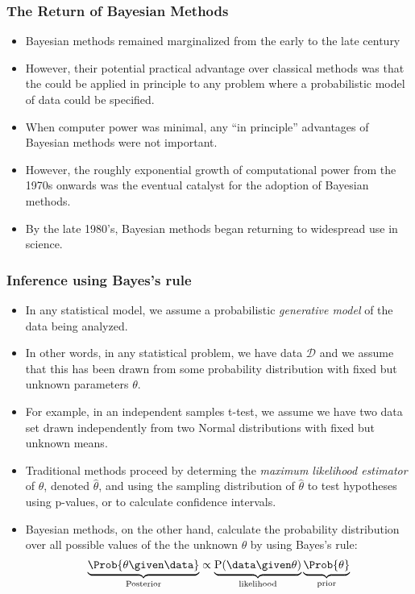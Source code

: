 \documentclass{slides}
\begin{document}
\begin{frame}
	\frametitle{The Return of Bayesian Methods}
	
	\begin{itemize}

		\item Bayesian methods remained marginalized from the early to
			the late  century

		\item However, their potential practical advantage over
			classical methods was that the could be applied in
			principle to any problem where a probabilistic model of
			data could be specified.  

		\item When computer power was minimal, any ``in principle''
			advantages of Bayesian methods were not important.

		\item However, the roughly exponential growth of computational
			power from the 1970s onwards was the eventual catalyst
			for the adoption of Bayesian methods.

		\item By the late 1980's, Bayesian methods began returning to
			widespread use in science.

	\end{itemize}
\end{frame}

\begin{frame}
	\frametitle{Inference using Bayes's rule}
	\begin{itemize}

		\item In any statistical model, we assume a probabilistic \emph{generative model} of the data being analyzed.
		\item In other words, in any statistical problem, we have data $\mathcal{D}$ and we assume that this has been drawn from some probability distribution with fixed but unknown parameters $\theta$.
		\item For example, in an independent samples t-test, we assume we have two data set drawn independently from two Normal distributions with fixed but unknown means.
		\item Traditional methods proceed by determing the \emph{maximum likelihood estimator} of $\theta$, denoted $\hat{\theta}$, and using the sampling distribution of $\hat{\theta}$ to test hypotheses using p-values, or to calculate confidence intervals.
		\item Bayesian methods, on the other hand, calculate the probability distribution over all possible values of the the unknown $\theta$ by using Bayes's rule:
		\[
			\underbrace{\Prob{\theta \given \data}}_{\text{Posterior}}
			\propto 
			\underbrace{\mathrm{P}(\data \given \theta)}_{\text{likelihood}}\underbrace{\Prob{\theta}}_{\text{prior}}
		\]
	\end{itemize}

\end{frame}
\end{document}
